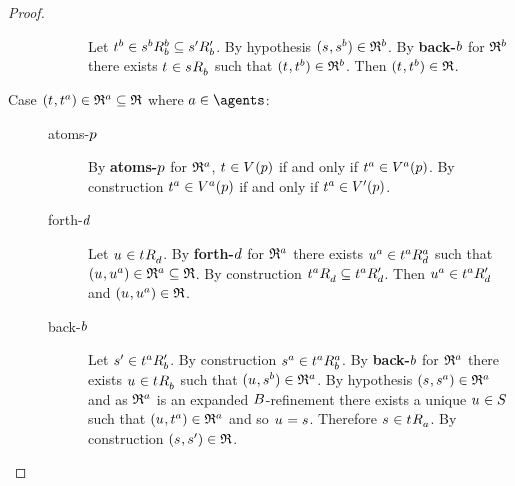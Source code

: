 \begin{proof}
\begin{description}
\begin{description}
                Let $\kStateT[\agentB] \in \kSuccessorsB[\agentB]{\kStateS[\agentB]} \subseteq \kSuccessorsPB{\kStateSP}$.
                By hypothesis $(\kStateS, \kStateS[\agentB]) \in \refinement^\agentB$.
                By {\bf back-$\agentB$} for $\refinement^\agentB$ there exists $\kStateT \in \kSuccessorsB{\kStateS}$ such that $(\kStateT, \kStateT[\agentB]) \in \refinement^\agentB$.
                Then $(\kStateT, \kStateT[\agentB]) \in \refinement$.
        \end{description}
    \item[{Case $(\kStateT, \kStateT[\agentA]) \in \refinement^\agentA \subseteq \refinement$ where $\agentA \in \agents$:}]
        \hfill
        \begin{description}
            \item[atoms-$\atomP$]
                By {\bf atoms-$\atomP$} for $\refinement^\agentA$, $\kStateT \in \kValuation(\atomP)$ if and only if $\kStateT[\agentA] \in \kValuation[\agentA](\atomP)$.
                By construction $\kStateT[\agentA] \in \kValuation[\agentA](\atomP)$ if and only if $\kStateT[\agentA] \in \kValuationP(\atomP)$.
            \item[forth-$\agentD$]
                Let $\kStateU \in \kSuccessorsD{\kStateT}$.
                By {\bf forth-$\agentD$} for $\refinement^\agentA$ there exists $\kStateU[\agentA] \in \kSuccessorsD[\agentA]{\kStateT[\agentA]}$ such that $(\kStateU, \kStateU[\agentA]) \in \refinement^\agentA \subseteq \refinement$.
                By construction $\kSuccessorsD{\kStateT[\agentA]} \subseteq \kSuccessorsPD{\kStateT[\agentA]}$.
                Then $\kStateU[\agentA] \in \kSuccessorsPD{\kStateT[\agentA]}$ and $(\kStateU, \kStateU[\agentA]) \in \refinement$.
            \item[back-$\agentB$]
                Let $\kStateSP \in \kSuccessorsPB{\kStateT[\agentA]}$.
                By construction $\kStateS[\agentA] \in \kSuccessorsB[\agentA]{\kStateT[\agentA]}$.
                By {\bf back-$\agentB$} for $\refinement^\agentA$ there exists $\kStateU \in \kSuccessorsB{\kStateT}$ such that $(\kStateU, \kStateS[\agentB]) \in \refinement^\agentA$.
                By hypothesis $(\kStateS, \kStateS[\agentA]) \in \refinement^\agentA$ and as $\refinement^\agentA$ is an expanded $\agentsB$-refinement there exists a unique $\kStateU \in \kStates$ such that $(\kStateU, \kStateT[\agentA]) \in \refinement^\agentA$ and so $\kStateU = \kStateS$.
                Therefore $\kStateS \in \kSuccessorsA{\kStateT}$.
                By construction $(\kStateS, \kStateSP) \in \refinement$.


\end{description}
\end{description}
\end{proof}
